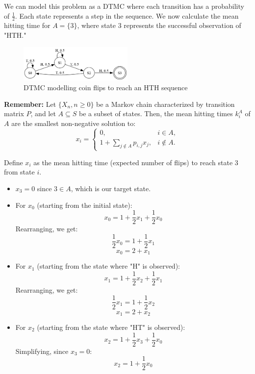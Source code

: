 \begin{solution}
  We can model this problem as a DTMC where each transition has a probability of $\frac{1}{2}$. Each state represents a step in the sequence. We now calculate the mean hitting time for $A = \{3\}$, where state 3 represents the successful observation of "HTH."

  \begin{figure}[h!]
    \begin{center}
      \includegraphics[width=0.5\textwidth]{img/23.2.png}
    \end{center}
    \caption{DTMC modelling coin flips to reach an HTH sequence}
  \end{figure}

  \textbf{Remember:} Let $\{X_n, n \geq 0\}$ be a Markov chain characterized by transition matrix $P$, and let $A \subseteq S$ be a subset of states. Then, the mean hitting times $k^A_i$ of $A$ are the smallest non-negative solution to:
  \[
    x_i =
    \begin{cases}
      0, & i \in A, \\
      1 + \sum_{j \notin A} p_{i,j} x_j, & i \notin A.
    \end{cases}
  \]

  Define \( x_i \) as the mean hitting time (expected number of flips) to reach state 3 from state \( i \).

  \begin{itemize}
    \item $x_3 = 0$ since $3 \in A$, which is our target state.
    \item For $x_0$ (starting from the initial state):
      \[
        x_0 = 1 + \frac{1}{2}x_1 + \frac{1}{2}x_0
      \]
      Rearranging, we get:
      \[
        \frac{1}{2}x_0 = 1 + \frac{1}{2}x_1
      \]
      \[
        x_0 = 2 + x_1
      \]

    \item For $x_1$ (starting from the state where "H" is observed):
      \[
        x_1 = 1 + \frac{1}{2}x_2 + \frac{1}{2}x_1
      \]
      Rearranging, we get:
      \[
        \frac{1}{2}x_1 = 1 + \frac{1}{2}x_2
      \]
      \[
        x_1 = 2 + x_2
      \]

    \item For $x_2$ (starting from the state where "HT" is observed):
      \[
        x_2 = 1 + \frac{1}{2}x_3 + \frac{1}{2}x_0
      \]
      Simplifying, since \( x_3 = 0 \):
      \[
        x_2 = 1 + \frac{1}{2}x_0
      \]
  \end{itemize}


\end{solution}
